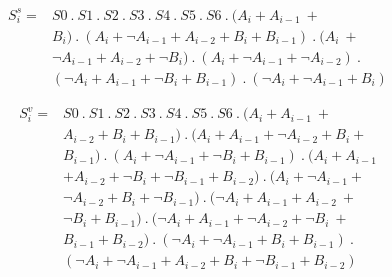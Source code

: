 \documentclass[conference]{IEEEtran}
\begin{document}
\vspace{-1em}
\begin{equation}
\begin{aligned}
S_{i}^{s} ={} &S0 \ . \ S1 \ . \ S2 \ . \ S3 \ . \ S4 \ . \ S5 \ . \ S6 \ . \ (A_{i} + A_{i-1} \ + \ \\
&B_{i}) \ . \ (A_{i} + \neg A_{i-1} + A_{i-2} + B_{i} + B_{i-1}) \ . \ (A_{i} \ + \ \\
&\neg A_{i-1} + A_{i-2} + \neg B_{i}) \ . \ (A_{i} + \neg A_{i-1} + \neg A_{i-2}) \ . \ \\
&( \neg A_{i} + A_{i-1} + \neg B_{i}+ B_{i-1}) \ . \ ( \neg A_{i} + \neg A_{i-1} + B_{i})
\end{aligned}
\end{equation}

\vspace{-1em}
\begin{equation}
\begin{aligned}
S_{i}^{v} ={} &S0 \ . \ S1 \ . \ S2 \ . \ S3 \ . \ S4 \ . \ S5 \ . \ S6 \ . \ (A_{i} + A_{i-1} \ + \ \\
&A_{i-2} + B_{i} + B_{i-1}) \ . \ (A_{i} + A_{i-1} + \neg A_{i-2} + B_{i} + \\
&B_{i-1}) \ . \ (A_{i} + \neg A_{i-1} + \neg B_{i} + B_{i-1}) \ . \ (A_{i} + A_{i-1} \\
&+ A_{i-2} + \neg B_{i} + \neg B_{i-1} + B_{i-2}) \ . \ (A_{i} + \neg A_{i-1} + \\
&\neg A_{i-2} + B_{i} + \neg B_{i-1}) \ . \ ( \neg A_{i} + A_{i-1} + A_{i-2} \ + \ \\
&\neg B_{i} + B_{i-1}) \ . \ (\neg A_{i} + A_{i-1} + \neg A_{i-2} + \neg B_{i} \ + \ \\
&B_{i-1} + B_{i-2}) \ . \ ( \neg A_{i} + \neg A_{i-1} + B_{i} + B_{i-1}) \ . \ \\
&( \neg A_{i} + \neg A_{i-1} + A_{i-2} + B_{i} + \neg B_{i-1} + B_{i-2})
\end{aligned}
\end{equation}
\end{document}
